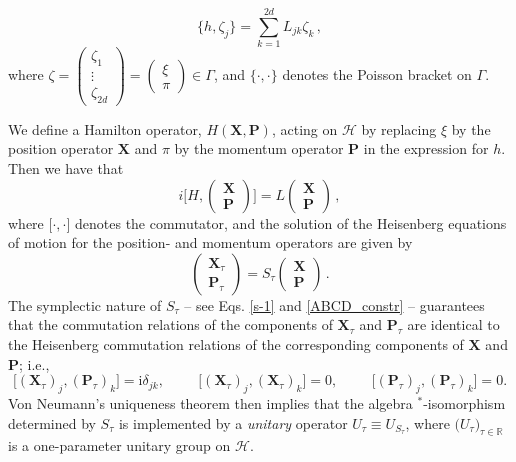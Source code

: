 \documentclass[11pt]{article}
\newcommand{\iu}{{\mathrm i}}
\begin{document}
\begin{equation}\label{Poisson}
\big\{ h, \zeta_j \big\} = \sum_{k=1}^{2d} L_{jk} \zeta_{k}\,,
\end{equation}
where $\zeta = \begin{pmatrix} \zeta_1 \\ \vdots \\ \zeta_{2d}\end{pmatrix}  = \begin{pmatrix} \xi \\ \pi \end{pmatrix} \in \Gamma$, and 
$\big\{\cdot, \cdot \big\}$ denotes the Poisson bracket on $\Gamma$.

We define a Hamilton operator, $H(\mathbf{X}, \mathbf{P})$, acting on $\mathcal{H}$ by replacing $\xi$ by the position operator $\mathbf{X}$ and $\pi$ by the momentum operator $\mathbf{P}$ in the expression for $h$. Then we have that
\begin{equation}\label{comm}
i \Big[ H, \begin{pmatrix} \mathbf{X} \\ \mathbf{P} \end{pmatrix} \Big] = 
L \begin{pmatrix} \mathbf{X} \\ \mathbf{P} \end{pmatrix}\,,
\end{equation}
where $\big[\cdot, \cdot \big]$ denotes the commutator, and the solution of the Heisenberg equations of motion for the position- and momentum operators are given by
\begin{equation}\label{Heisenberg-dyn}
\begin{pmatrix} \mathbf{X}_{\tau} \\ \mathbf{P}_{\tau} \end{pmatrix} = S_{\tau} \begin{pmatrix} \mathbf{X} \\ \mathbf{P} \end{pmatrix}\,. 
\end{equation}
The symplectic nature of $S_{\tau}$ -- see Eqs. \eqref{s-1} and \eqref{ABCD_constr} -- guarantees that the commutation relations of the components of $\mathbf{X}_{\tau}$ 
and $\mathbf{P}_{\tau}$ are identical to the Heisenberg commutation relations of the corresponding components of 
$\mathbf{X}$ and $\mathbf{P}$; i.e.,
$$
\big[(\mathbf X_ \tau)_j, (\mathbf P_ \tau)_k] = \iu \delta_{jk}, \hspace{1cm} \big[(\mathbf X_ \tau)_j, (\mathbf X_ \tau)_k] = 0, \hspace{1cm} \big[(\mathbf P_ \tau)_j, (\mathbf P_ \tau)_k] = 0  .
$$
Von Neumann's uniqueness theorem then implies that the algebra 
$^{*}$-isomorphism determined by $S_{\tau}$ is implemented by a \textit{unitary} operator $U_{\tau}\equiv U_{S_{\tau}}$, where 
$\big(U_{\tau}\big)_{\tau \in \mathbb{R}}$ is a one-parameter unitary group on $\mathcal{H}$.
\end{document}

